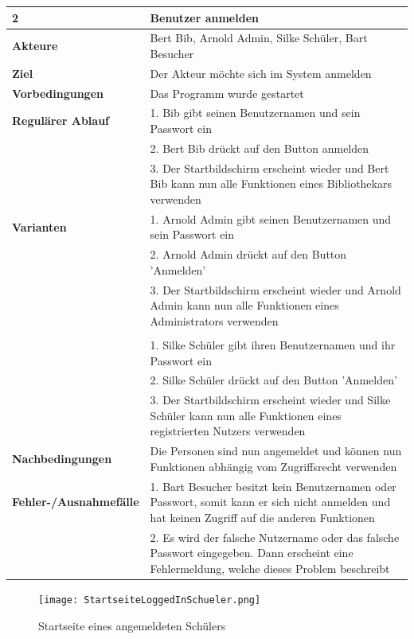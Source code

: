 \documentclass[fontsize=12pt,paper=a4,twoside]{scrartcl}
\begin{document}
\begin{table}
	[H] \label{2} 
	\begin{tabular}
		{|l|p{10cm}|} \hline \textbf{2} & \textbf{Benutzer anmelden} \\
		\hline \textbf{Akteure} & Bert Bib, Arnold Admin, Silke Schüler, Bart Besucher\\
		\hline \textbf{Ziel} & Der Akteur möchte sich im System anmelden \\
		\hline \textbf{Vorbedingungen} & Das Programm wurde gestartet \\
		\hline \textbf{Regulärer Ablauf} & 1. Bib gibt seinen Benutzernamen und sein Passwort ein \\
		&2. Bert Bib drückt auf den Button anmelden\\
		&3. Der Startbildschirm erscheint wieder und Bert Bib kann nun alle Funktionen eines Bibliothekars verwenden\\
		\hline \textbf{Varianten} & 1. Arnold Admin gibt seinen Benutzernamen und sein Passwort ein \\
		&2. Arnold Admin drückt auf den Button 'Anmelden'\\
		&3. Der Startbildschirm erscheint wieder und Arnold Admin kann nun alle Funktionen eines Administrators verwenden\\
		& \\
		&1. Silke Schüler gibt ihren Benutzernamen und ihr Passwort ein \\
		&2. Silke Schüler drückt auf den Button 'Anmelden'\\
		&3. Der Startbildschirm erscheint wieder und Silke Schüler kann nun alle Funktionen eines registrierten Nutzers verwenden\\
		\hline \textbf{Nachbedingungen} & Die Personen sind nun angemeldet und können nun Funktionen abhängig vom Zugriffsrecht verwenden \\
		\hline \textbf{Fehler-/Ausnahmefälle} & 1. Bart Besucher besitzt kein Benutzernamen oder Passwort, somit kann er sich nicht anmelden und hat keinen Zugriff auf die anderen Funktionen \\
		&2. Es wird der falsche Nutzername oder das falsche Passwort eingegeben. Dann erscheint eine Fehlermeldung, welche dieses Problem beschreibt \\
		\hline 
	\end{tabular}
\end{table}
\begin{figure}
	[H] \caption{Startseite eines angemeldeten Schülers} 
	\texttt{[image: StartseiteLoggedInSchueler.png]} \label{pic:StartSchueler} 
\end{figure}
\end{document}
